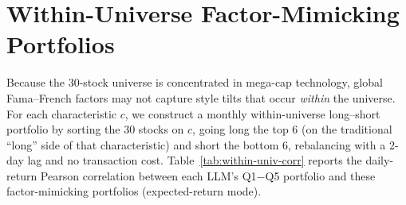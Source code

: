 \section{Within-Universe Factor-Mimicking Portfolios}
\label{app:within-univ}

Because the 30-stock universe is concentrated in mega-cap technology, global Fama--French factors may not capture style tilts that occur \emph{within} the universe.
For each characteristic $c$, we construct a monthly within-universe long--short portfolio by sorting the 30 stocks on $c$, going long the top 6 (on the traditional ``long'' side of that characteristic) and short the bottom 6, rebalancing with a 2-day lag and no transaction cost.
Table~\ref{tab:within-univ-corr} reports the daily-return Pearson correlation between each LLM's Q1$-$Q5 portfolio and these factor-mimicking portfolios (expected-return mode).

